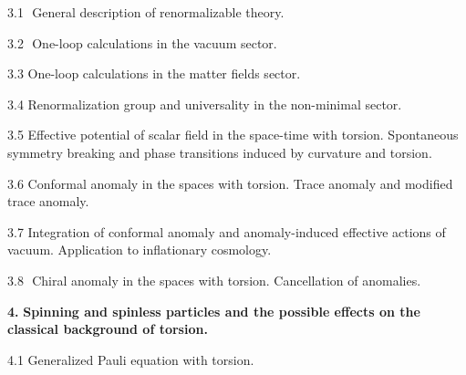 \vskip 1mm \noindent
{3.1$\,\,$ General description of renormalizable theory.}

\vskip 1mm \noindent
{3.2$\,\,$ One-loop calculations in the vacuum sector.}

\vskip 1mm \noindent
{3.3$\,\,$One-loop calculations in the matter fields 
sector.}

\vskip 1mm \noindent
{3.4$\,\,$Renormalization group and universality 
in the non-minimal sector.}

\vskip 1mm \noindent
{3.5$\,\,$Effective potential of 
scalar field in the space-time with torsion. 
Spontaneous symmetry
breaking and phase transitions induced by curvature and torsion.}

\vskip 1mm \noindent
{3.6$\,\,$Conformal anomaly in the spaces with torsion. 
Trace anomaly and modified trace anomaly.}

\vskip 1mm \noindent
{3.7$\,\,$Integration of conformal anomaly
and anomaly-induced effective actions of vacuum.
Application to inflationary cosmology.}

\vskip 1mm \noindent 
{3.8 $\,\,$Chiral anomaly in the spaces with torsion.
Cancellation of anomalies.}

\vskip 3mm 
{\large\bf 4.$\,\,$Spinning and spinless particles and the 
possible effects on the classical background of torsion.}

\vskip 1mm \noindent
{4.1$\,\,$Generalized Pauli equation with torsion.}

